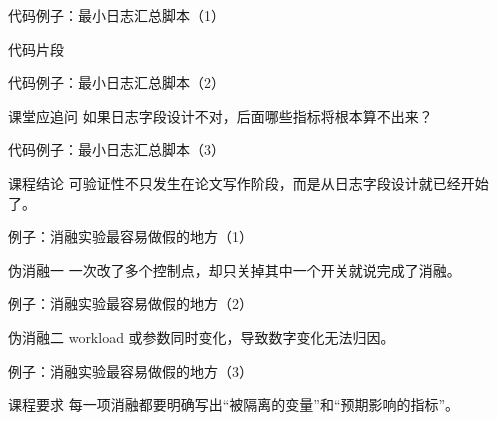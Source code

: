 \begin{frame}{代码例子：最小日志汇总脚本（1）}
\begin{block}{代码片段}
    {\ttfamily\small
    \par
    \par
    \par
    }
  \end{block}
\end{frame}

\begin{frame}{代码例子：最小日志汇总脚本（2）}
\begin{block}{课堂应追问}
    如果日志字段设计不对，后面哪些指标将根本算不出来？
  \end{block}
\end{frame}

\begin{frame}{代码例子：最小日志汇总脚本（3）}
\begin{block}{课程结论}
    可验证性不只发生在论文写作阶段，而是从日志字段设计就已经开始了。
  \end{block}
\end{frame}

\begin{frame}{例子：消融实验最容易做假的地方（1）}
\begin{block}{伪消融一}
    一次改了多个控制点，却只关掉其中一个开关就说完成了消融。
  \end{block}
\end{frame}

\begin{frame}{例子：消融实验最容易做假的地方（2）}
\begin{block}{伪消融二}
    workload 或参数同时变化，导致数字变化无法归因。
  \end{block}
\end{frame}

\begin{frame}{例子：消融实验最容易做假的地方（3）}
\begin{block}{课程要求}
    每一项消融都要明确写出“被隔离的变量”和“预期影响的指标”。
  \end{block}
\end{frame}

